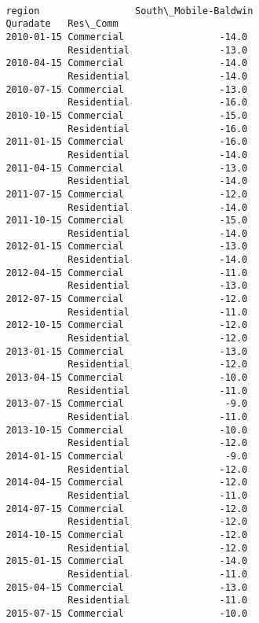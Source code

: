 \documentclass[11pt]{article}
\begin{document}
\begin{Verbatim}[commandchars=\\\{\}]
                                                      
         region                 South\_Mobile-Baldwin  
         Quradate   Res\_Comm                          
         2010-01-15 Commercial                 -14.0  
                    Residential                -13.0  
         2010-04-15 Commercial                 -14.0  
                    Residential                -14.0  
         2010-07-15 Commercial                 -13.0  
                    Residential                -16.0  
         2010-10-15 Commercial                 -15.0  
                    Residential                -16.0  
         2011-01-15 Commercial                 -16.0  
                    Residential                -14.0  
         2011-04-15 Commercial                 -13.0  
                    Residential                -14.0  
         2011-07-15 Commercial                 -12.0  
                    Residential                -14.0  
         2011-10-15 Commercial                 -15.0  
                    Residential                -14.0  
         2012-01-15 Commercial                 -13.0  
                    Residential                -14.0  
         2012-04-15 Commercial                 -11.0  
                    Residential                -13.0  
         2012-07-15 Commercial                 -12.0  
                    Residential                -11.0  
         2012-10-15 Commercial                 -12.0  
                    Residential                -12.0  
         2013-01-15 Commercial                 -13.0  
                    Residential                -12.0  
         2013-04-15 Commercial                 -10.0  
                    Residential                -11.0  
         2013-07-15 Commercial                  -9.0  
                    Residential                -11.0  
         2013-10-15 Commercial                 -10.0  
                    Residential                -12.0  
         2014-01-15 Commercial                  -9.0  
                    Residential                -12.0  
         2014-04-15 Commercial                 -12.0  
                    Residential                -11.0  
         2014-07-15 Commercial                 -12.0  
                    Residential                -12.0  
         2014-10-15 Commercial                 -12.0  
                    Residential                -12.0  
         2015-01-15 Commercial                 -14.0  
                    Residential                -11.0  
         2015-04-15 Commercial                 -13.0  
                    Residential                -11.0  
         2015-07-15 Commercial                 -10.0  

\end{Verbatim}
\end{document}
